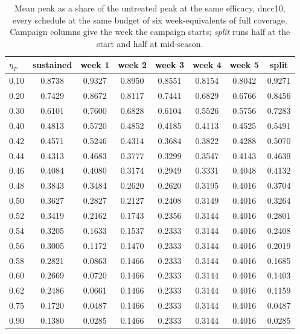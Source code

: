 \begin{table}[htbp]
\centering\small
\caption{Mean peak as a share of the untreated peak at the same efficacy, dncc10, every schedule at the same budget of six week-equivalents of full coverage. Campaign columns give the week the campaign starts; \emph{split} runs half at the start and half at mid-season.}
\label{tab:schedules-dncc10}
\begin{tabular}{@{}lccccccc@{}}
\toprule
$\eta_{F}$ & sustained & week 1 & week 2 & week 3 & week 4 & week 5 & split \\
\midrule
0.10 & 0.8738 & 0.9327 & 0.8950 & 0.8551 & 0.8154 & 0.8042 & 0.9271 \\
0.20 & 0.7429 & 0.8672 & 0.8117 & 0.7441 & 0.6829 & 0.6766 & 0.8456 \\
0.30 & 0.6101 & 0.7600 & 0.6828 & 0.6104 & 0.5526 & 0.5756 & 0.7283 \\
0.40 & 0.4813 & 0.5720 & 0.4852 & 0.4185 & 0.4113 & 0.4525 & 0.5491 \\
0.42 & 0.4571 & 0.5246 & 0.4314 & 0.3684 & 0.3822 & 0.4288 & 0.5070 \\
0.44 & 0.4313 & 0.4683 & 0.3777 & 0.3299 & 0.3547 & 0.4143 & 0.4639 \\
0.46 & 0.4084 & 0.4080 & 0.3174 & 0.2949 & 0.3331 & 0.4048 & 0.4132 \\
0.48 & 0.3843 & 0.3484 & 0.2620 & 0.2620 & 0.3195 & 0.4016 & 0.3704 \\
0.50 & 0.3627 & 0.2827 & 0.2127 & 0.2408 & 0.3149 & 0.4016 & 0.3264 \\
0.52 & 0.3419 & 0.2162 & 0.1743 & 0.2356 & 0.3144 & 0.4016 & 0.2801 \\
0.54 & 0.3205 & 0.1633 & 0.1537 & 0.2333 & 0.3144 & 0.4016 & 0.2408 \\
0.56 & 0.3005 & 0.1172 & 0.1470 & 0.2333 & 0.3144 & 0.4016 & 0.2019 \\
0.58 & 0.2821 & 0.0863 & 0.1466 & 0.2333 & 0.3144 & 0.4016 & 0.1685 \\
0.60 & 0.2669 & 0.0720 & 0.1466 & 0.2333 & 0.3144 & 0.4016 & 0.1403 \\
0.62 & 0.2486 & 0.0661 & 0.1466 & 0.2333 & 0.3144 & 0.4016 & 0.1159 \\
0.75 & 0.1720 & 0.0487 & 0.1466 & 0.2333 & 0.3144 & 0.4016 & 0.0487 \\
0.90 & 0.1380 & 0.0285 & 0.1466 & 0.2333 & 0.3144 & 0.4016 & 0.0285 \\
\bottomrule
\end{tabular}
\end{table}
